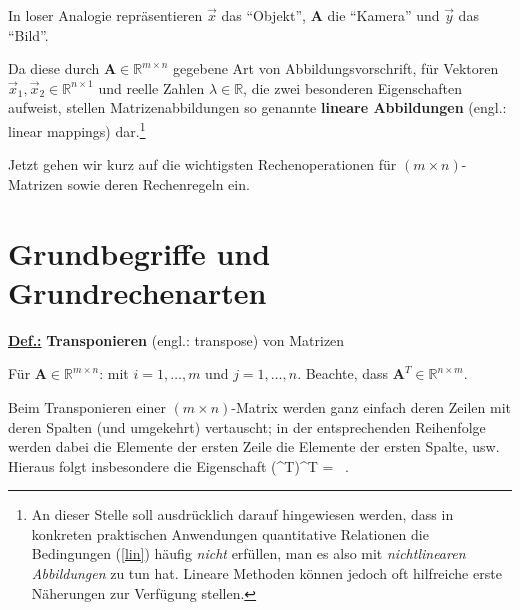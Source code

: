 \medskip
\noindent
In loser Analogie repr\"asentieren $\vec{x}$ das "`Objekt"',
$\mathbf{A}$ die "`Kamera"' und $\vec{y}$ das "`Bild"'.

\medskip
\noindent
Da diese durch $\mathbf{A} \in \mathbb{R}^{m \times n}$
gegebene Art von Abbildungsvorschrift, f\"ur Vektoren
$\vec{x}_{1},\vec{x}_{2} \in \mathbb{R}^{n \times 1}$ und
reelle Zahlen $\lambda \in \mathbb{R}$, die zwei besonderen
Eigenschaften
%
\be
{}
\ee
%
aufweist, stellen Matrizenabbildungen so genannte {\bf
lineare Abbildungen} (engl.: linear mappings) dar.\footnote{An 
dieser Stelle soll ausdr\"ucklich darauf hingewiesen werden, dass 
in konkreten praktischen Anwendungen quantitative Relationen die
Bedingungen (\ref{lin}) h\"aufig {\em nicht\/} erf\"ullen,
man es also mit {\em nichtlinearen Abbildungen\/} zu tun hat.
Lineare Methoden k\"onnen jedoch oft hilfreiche erste
N\"aherungen zur Verf\"ugung stellen.}

\medskip
\noindent
Jetzt gehen wir kurz auf die wichtigsten Rechenoperationen
f\"ur $(m \times n)$-Matrizen sowie deren Rechenregeln ein.

\section[Grundbegriffe und Grundrechenarten]%
{Grundbegriffe und Grundrechenarten}

\noindent
\underline{\bf Def.:}
{\bf Transponieren} (engl.: transpose) von Matrizen

\noindent
F\"ur $\mathbf{A} \in \mathbb{R}^{m \times n}$:
%
\be
{}
\ee
%
mit $i=1,\ldots,m$ und $j=1,\ldots,n$. Beachte, dass
$\mathbf{A}^{T} \in \mathbb{R}^{n \times m}$.

\medskip
\noindent
Beim Transponieren einer $(m \times n)$-Matrix werden ganz
einfach deren Zeilen mit deren Spalten (und umgekehrt)
vertauscht; in der entsprechenden Reihenfolge werden dabei die
Elemente der ersten Zeile die Elemente der ersten Spalte, usw. Hieraus folgt insbesondere die Eigenschaft
%
\be
(^{T})^{T} =  \ .
\ee
%


